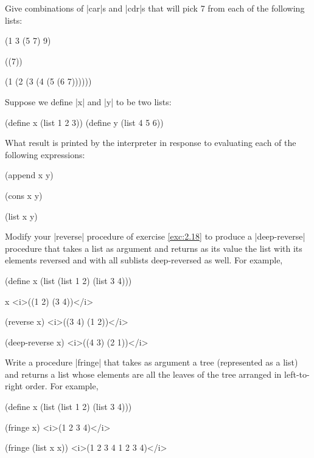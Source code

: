 \begin{Exercise}
\label{exc:2.25}
Give combinations of \scheme|car|s and \scheme|cdr|s that will pick 7 from
each of the following lists:

\begin{schemedisplay}
(1 3 (5 7) 9)

((7))

(1 (2 (3 (4 (5 (6 7))))))
\end{schemedisplay}
\end{Exercise}

\begin{Exercise}
\label{exc:2.26}
Suppose we define \scheme|x| and \scheme|y| to be two lists:

\begin{schemedisplay}
(define x (list 1 2 3))
(define y (list 4 5 6))
\end{schemedisplay}
What result is printed by the interpreter in response to evaluating
each of the following expressions:

\begin{schemedisplay}
(append x y)

(cons x y)

(list x y)
\end{schemedisplay}
\end{Exercise}

\begin{Exercise}
\label{exc:2.27}
Modify your \scheme|reverse| procedure of exercise \ref{exc:2.18} to
produce a \scheme|deep-reverse| procedure that takes a list as argument
and returns as its value the list with its elements reversed and with
all sublists deep-reversed as well.  For example,

\begin{schemedisplay}
(define x (list (list 1 2) (list 3 4)))

x
<i>((1 2) (3 4))</i>

(reverse x)
<i>((3 4) (1 2))</i>

(deep-reverse x)
<i>((4 3) (2 1))</i>
\end{schemedisplay}
\end{Exercise}

\begin{Exercise}
\label{exc:2.28}
Write a procedure \scheme|fringe| that takes as argument a tree
(represented as a list) and returns a list whose elements are all the
leaves of the tree arranged in left-to-right order.  For example,

\begin{schemedisplay}
(define x (list (list 1 2) (list 3 4)))

(fringe x)
<i>(1 2 3 4)</i>

(fringe (list x x))
<i>(1 2 3 4 1 2 3 4)</i>
\end{schemedisplay}
\end{Exercise}

